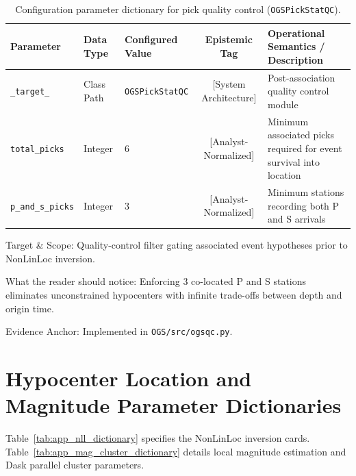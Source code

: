 \begin{table}[htbp]
  \centering
  \small
  \caption{Configuration parameter dictionary for pick quality control (\texttt{OGSPickStatQC}).}
  \label{tab:app_qc_dictionary}
  \begin{threeparttable}
    \begin{tabularx}{\linewidth}{l l l c X}
      \toprule
      \textbf{Parameter} & \textbf{Data Type} & \textbf{Configured Value} & \textbf{Epistemic Tag} & \textbf{Operational Semantics / Description} \\
      \midrule
      \texttt{\_target\_} & Class Path & \texttt{OGSPickStatQC} & [System Architecture] & Post-association quality control module \\
      \texttt{total\_picks} & Integer & $6$ & [Analyst-Normalized] & Minimum associated picks required for event survival into location \\
      \texttt{p\_and\_s\_picks} & Integer & $3$ & [Analyst-Normalized] & Minimum stations recording both P and S arrivals \\
      \bottomrule
    \end{tabularx}
    \begin{tablenotes}[flushleft]
      \footnotesize
      \item Target \& Scope: Quality-control filter gating associated event hypotheses prior to NonLinLoc inversion.
      \item What the reader should notice: Enforcing 3 co-located P and S stations eliminates unconstrained hypocenters with infinite trade-offs between depth and origin time.
      \item Evidence Anchor: Implemented in \texttt{OGS/src/ogsqc.py}.
    \end{tablenotes}
  \end{threeparttable}
\end{table}

\section{Hypocenter Location and Magnitude Parameter Dictionaries}
\label{sec:app_loc_mag_params}

Table~\ref{tab:app_nll_dictionary} specifies the NonLinLoc inversion cards. Table~\ref{tab:app_mag_cluster_dictionary} details local magnitude estimation and Dask parallel cluster parameters.

